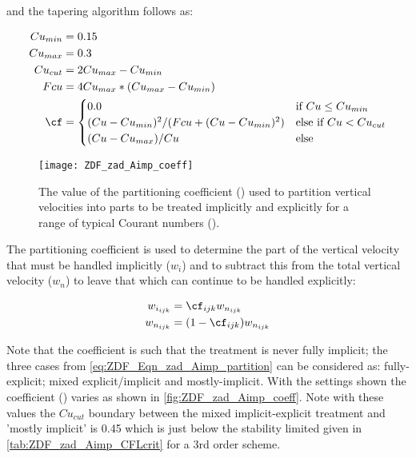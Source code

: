 \documentclass[../main/NEMO_manual]{subfiles}
\begin{document}
\noindent and the tapering algorithm follows \citep{shchepetkin_OM15} as:

\begin{align}
  \label{eq:ZDF_Eqn_zad_Aimp_partition}
Cu_{min} &= 0.15 \nonumber \\
Cu_{max} &= 0.3  \nonumber \\
Cu_{cut} &= 2Cu_{max} - Cu_{min} \nonumber \\
Fcu    &= 4Cu_{max}*(Cu_{max}-Cu_{min}) \nonumber \\
\cf &=
     \begin{cases}
        0.0                                                        &\text{if $Cu \leq Cu_{min}$} \\
        (Cu - Cu_{min})^2 / (Fcu +  (Cu - Cu_{min})^2)             &\text{else if $Cu < Cu_{cut}$} \\
        (Cu - Cu_{max}) / Cu                                       &\text{else}
     \end{cases}
\end{align}

\begin{figure}[!t]
  \centering
  \texttt{[image: ZDF\_zad\_Aimp\_coeff]}
  \caption[Partitioning coefficient used to partition vertical velocities into parts]{
    The value of the partitioning coefficient (\cf) used to partition vertical velocities into
    parts to be treated implicitly and explicitly for a range of typical Courant numbers
    ().}
  \label{fig:ZDF_zad_Aimp_coeff}
\end{figure}

\noindent The partitioning coefficient is used to determine the part of the vertical
velocity that must be handled implicitly ($w_i$) and to subtract this from the total
vertical velocity ($w_n$) to leave that which can continue to be handled explicitly:

\begin{align}
  \label{eq:ZDF_Eqn_zad_Aimp_partition2}
    w_{i_{ijk}} &= \cf_{ijk} w_{n_{ijk}}     \nonumber \\
    w_{n_{ijk}} &= (1-\cf_{ijk}) w_{n_{ijk}}
\end{align}

\noindent Note that the coefficient is such that the treatment is never fully implicit;
the three cases from \autoref{eq:ZDF_Eqn_zad_Aimp_partition} can be considered as:
fully-explicit; mixed explicit/implicit and mostly-implicit.  With the settings shown the
coefficient (\cf) varies as shown in \autoref{fig:ZDF_zad_Aimp_coeff}. Note with these values
the $Cu_{cut}$ boundary between the mixed implicit-explicit treatment and 'mostly
implicit' is 0.45 which is just below the stability limited given in
\autoref{tab:ZDF_zad_Aimp_CFLcrit}  for a 3rd order scheme.
\end{document}
